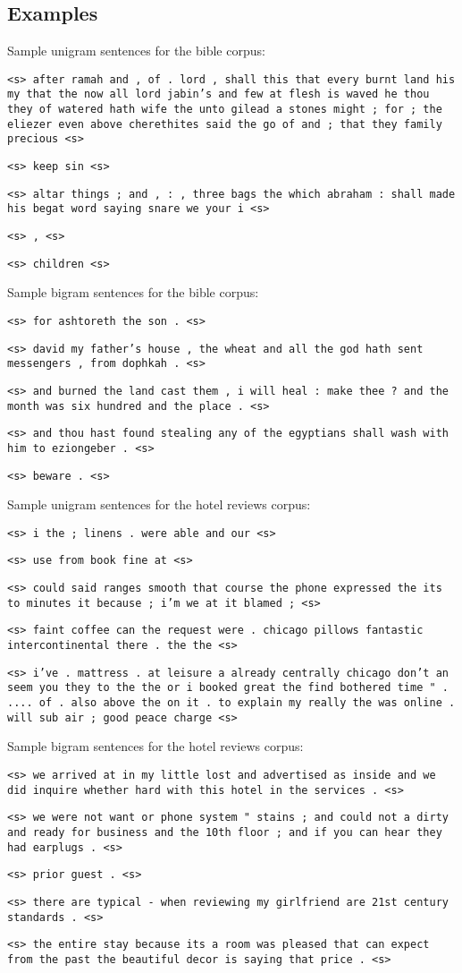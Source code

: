 \documentclass{article}
\begin{document}
\subsection{Examples}
\setlength{\parindent}{0cm}
\newcommand\npar{\par\smallskip}
Sample unigram sentences for the bible corpus:\npar
\texttt{<s> after ramah and , of . lord , shall this that every burnt land his my that the now all lord jabin's and few at flesh is waved he thou they of watered hath wife the unto gilead a stones might ; for ; the eliezer even above cherethites said the go of and ; that they family precious <s>}\npar
\texttt{<s> keep sin <s>}\npar
\texttt{<s> altar things ; and , : , three bags the which abraham : shall made his begat word saying snare we your i <s>}\npar
\texttt{<s> , <s>}\npar
\texttt{<s> children <s>}\npar
\bigskip

Sample bigram sentences for the bible corpus:\npar
\texttt{<s> for ashtoreth the son . <s>}\npar
\texttt{<s> david my father's house , the wheat and all the god hath sent messengers , from dophkah . <s>}\npar
\texttt{<s> and burned the land cast them , i will heal : make thee ? and the month was six hundred and the place . <s>}\npar
\texttt{<s> and thou hast found stealing any of the egyptians shall wash with him to eziongeber . <s>}\npar
\texttt{<s> beware . <s>}\npar
\bigskip

Sample unigram sentences for the hotel reviews corpus:\npar
\texttt{<s> i the ; linens . were able and our <s>}\npar
\texttt{<s> use from book fine at <s>}\npar
\texttt{<s> could said ranges smooth that course the phone expressed the its to minutes it because ; i'm we at it blamed ; <s>}\npar
\texttt{<s> faint coffee can the request were . chicago pillows fantastic intercontinental there . the the <s>}\npar
\texttt{<s> i've . mattress . at leisure a already centrally chicago don't an seem you they to the the or i booked great the find bothered time " . .... of . also above the on it . to explain my really the was online . will sub air ; good peace charge <s>}\npar
\bigskip

Sample bigram sentences for the hotel reviews corpus:\npar
\texttt{<s> we arrived at in my little lost and advertised as inside and we did inquire whether hard with this hotel in the services . <s>}\npar
\texttt{<s> we were not want or phone system " stains ; and could not a dirty and ready for business and the 10th floor ; and if you can hear they had earplugs . <s>}\npar
\texttt{<s> prior guest . <s>}\npar
\texttt{<s> there are typical - when reviewing my girlfriend are 21st century standards . <s>}\npar
\texttt{<s> the entire stay because its a room was pleased that can expect from the past the beautiful decor is saying that price . <s>}\npar
\end{document}
